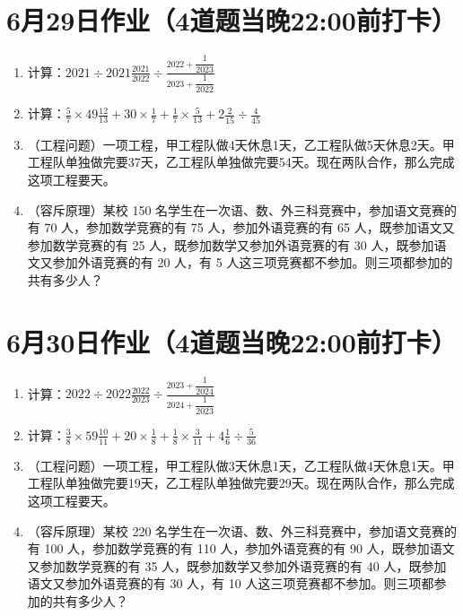 \documentclass[UTF8,12pt,a4paper]{ctexart}
\newcommand{\BottomWriteSpace}{2.5cm}
\newenvironment{OnePageFourFill}{
  \small
  \vspace*{0pt}
  \begin{enumerate}[leftmargin=*, itemsep=0pt, topsep=0pt, parsep=0pt, partopsep=0pt]
  \setlength{\parskip}{0pt}
}{
  \end{enumerate}
  \vspace*{\BottomWriteSpace}
  \normalsize
  \newpage
}
\newcommand{\Q}[1]{\item #1\par\vfill}
\newcommand{\Qlast}[1]{\item #1\par}
\begin{document}
\section*{6月29日作业（4道题当晚22:00前打卡）}
\begin{OnePageFourFill}

\Q{计算：$\displaystyle 2021 \div 2021\frac{2021}{2022} \div \frac{2022 + \dfrac{1}{2023}}{2023 + \dfrac{1}{2022}}$}

\Q{计算：$\displaystyle \frac{5}{7} \times 49\frac{12}{13} + 30 \times \frac{1}{7} + \frac{1}{7} \times \frac{5}{13} + 2\frac{2}{15} \div \frac{4}{45}$}

\Q{（工程问题）一项工程，甲工程队做4天休息1天，乙工程队做5天休息2天。甲工程队单独做完要37天，乙工程队单独做完要54天。现在两队合作，那么完成这项工程要\underline{\hspace{3em}}天。}

\Qlast{（容斥原理）某校 150 名学生在一次语、数、外三科竞赛中，参加语文竞赛的有 70 人，参加数学竞赛的有 75 人，参加外语竞赛的有 65 人，既参加语文又参加数学竞赛的有 25 人，既参加数学又参加外语竞赛的有 30 人，既参加语文又参加外语竞赛的有 20 人，有 5 人这三项竞赛都不参加。则三项都参加的共有多少人？}

\end{OnePageFourFill}

\section*{6月30日作业（4道题当晚22:00前打卡）}
\begin{OnePageFourFill}

\Q{计算：$\displaystyle 2022 \div 2022\frac{2022}{2023} \div \frac{2023 + \dfrac{1}{2024}}{2024 + \dfrac{1}{2023}}$}

\Q{计算：$\displaystyle \frac{3}{8} \times 59\frac{10}{11} + 20 \times \frac{1}{8} + \frac{1}{8} \times \frac{3}{11} + 4\frac{1}{6} \div \frac{5}{36}$}

\Q{（工程问题）一项工程，甲工程队做3天休息1天，乙工程队做4天休息1天。甲工程队单独做完要19天，乙工程队单独做完要29天。现在两队合作，那么完成这项工程要\underline{\hspace{3em}}天。}

\Qlast{（容斥原理）某校 220 名学生在一次语、数、外三科竞赛中，参加语文竞赛的有 100 人，参加数学竞赛的有 110 人，参加外语竞赛的有 90 人，既参加语文又参加数学竞赛的有 35 人，既参加数学又参加外语竞赛的有 40 人，既参加语文又参加外语竞赛的有 30 人，有 10 人这三项竞赛都不参加。则三项都参加的共有多少人？}

\end{OnePageFourFill}
\end{document}
